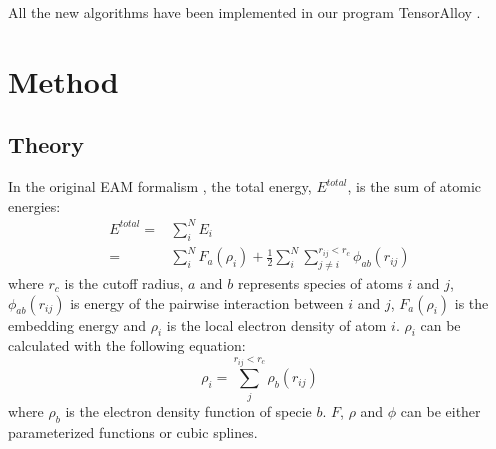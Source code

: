 \documentclass[final,3p,times]{elsarticle}
\begin{document}
All the new algorithms have been implemented in our program TensorAlloy 
\cite{TensorAlloy}.

% 
%
\section{Method}
\label{sec:method}


\subsection{Theory}
\label{sec:theory}

In the original EAM formalism \cite{EAM0}, the total energy, $E^{total}$, is the 
sum of atomic energies:
\begin{align}
E^{total} = & \sum_{i}^{N}{E_{i}} \nonumber \\
\label{eq:eam_total_energy}
= & \sum_{i}^{N}{F_{a}(\rho_i)} + 
    \frac{1}{2}\sum_{i}^{N}{\sum_{j \neq i}^{r_{ij} < r_c}{
    \phi_{ab}(r_{ij})
}}
\end{align}
where $r_c$ is the cutoff radius, $a$ and $b$ represents species of atoms $i$ 
and $j$, $\phi_{ab}(r_{ij})$ is energy of the pairwise interaction between $i$ 
and $j$, $F_{a}(\rho_{i})$ is the embedding energy and $\rho_{i}$ is the local 
electron density of atom $i$. $\rho_{i}$ can be calculated with the following 
equation:
\begin{equation}
\label{eq:rho_eam}
\rho_{i} = \sum_{j}^{r_{ij} < r_{c}}{
    \rho_{b}(r_{ij})
}
\end{equation}
where $\rho_{b}$ is the electron density function of specie $b$. 
$F$, $\rho$ and $\phi$ can be either parameterized functions or cubic splines.
\end{document}
